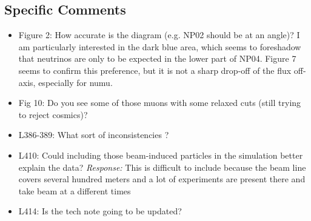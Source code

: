 \documentclass[11pt]{article}
\begin{document}
\subsection*{Specific Comments}
\begin{itemize}
    \item Figure 2: How accurate is the diagram (e.g. NP02 should be at an angle)? I am particularly interested in the dark blue area, which seems to foreshadow that neutrinos are only to be expected in the lower part of NP04. Figure 7 seems to confirm this preference, but it is not a sharp drop-off of the flux off-axis, especially for numu.
    \item Fig 10: Do you see some of those muons with some relaxed cuts (still trying to reject cosmics)?
    \item L386-389: What sort of inconsistencies ?
    
    \item L410: Could including those beam-induced particles in the simulation better explain the data?
    \textit{Response:} This is difficult to include because the beam line covers several hundred meters and a lot of experiments are present there and take beam at a different times
     \item L414: Is the tech note going to be updated?
   

\end{itemize}
\end{document}
